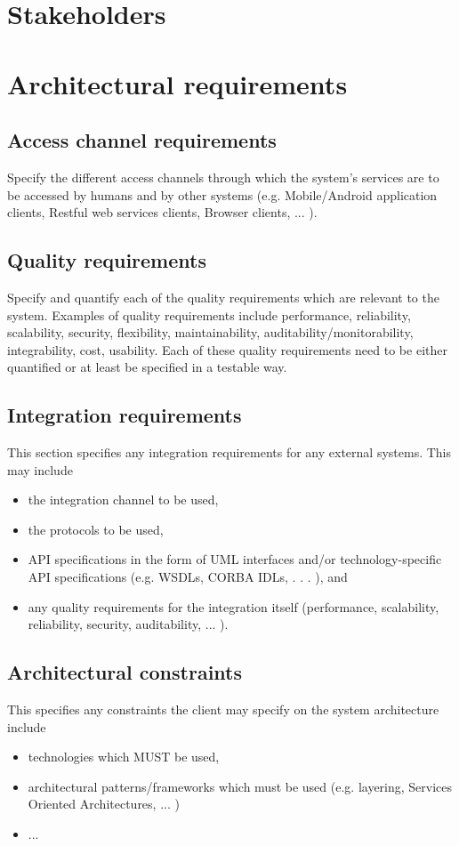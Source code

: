 \documentclass[11pt,a4paper]{article}
\begin{document}
\section{Stakeholders}
\section{Architectural requirements}
\subsection{Access channel requirements}
Specify the different access channels through which the system's services are to be accessed by humans and by other systems (e.g. Mobile/Android application clients, Restful web services clients,
Browser clients, ... ).
\subsection{Quality requirements}
Specify and quantify each of the quality requirements which are relevant to the system. Examples of quality requirements include performance, reliability, scalability, security, flexibility, maintainability, auditability/monitorability, integrability, cost, usability. Each of these quality requirements need to be either quantified or at least be specified in a testable way.
\subsection{Integration requirements}
This section specifies any integration requirements for any external systems. This may include
\begin{itemize}
\item the integration channel to be used,
\item the protocols to be used,
\item API specifications in the form of UML interfaces and/or technology-specific API specifications
(e.g. WSDLs, CORBA IDLs, . . . ), and
\item any quality requirements for the integration itself (performance, scalability, reliability, security, auditability, ... ).
\end{itemize}
\subsection{Architectural constraints}
This specifies any constraints the client may specify on the system architecture include
\begin{itemize}
\item technologies which MUST be used,
\item architectural patterns/frameworks which must be used (e.g. layering, Services Oriented Architectures, ... )
\item ...
\end{itemize}
\end{document}
